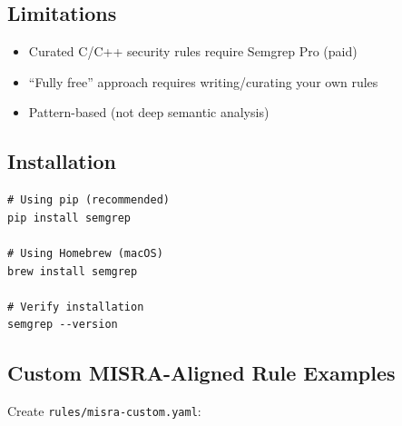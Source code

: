 \documentclass[11pt,letterpaper]{report}
\begin{document}
\subsection{Limitations}

\begin{itemize}[leftmargin=*]
    \item Curated C/C++ security rules require Semgrep Pro (paid)
    \item ``Fully free'' approach requires writing/curating your own rules
    \item Pattern-based (not deep semantic analysis)
\end{itemize}

\subsection{Installation}

\begin{verbatim}
# Using pip (recommended)
pip install semgrep

# Using Homebrew (macOS)
brew install semgrep

# Verify installation
semgrep --version
\end{verbatim}

\subsection{Custom MISRA-Aligned Rule Examples}

Create \texttt{rules/misra-custom.yaml}:
\end{document}
